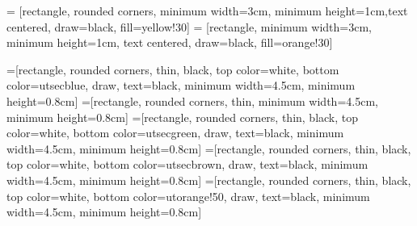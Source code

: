 \def\drawNodes(#1,#2,#3,#4,#5,#6,#7){ %
\foreach \x in {#1,#7,...,#2}{
	\foreach \y in {#3,#7,...,#4}{
		\foreach \z in {#5,#7,...,#6}{
				\draw[fill=red!60] (\x,\y,\z) circle (0.15);
				}
			}
	}				
		
}


\makeatletter
\newcommand\resetstackedplots{
\makeatletter
\pgfplots@stacked@isfirstplottrue
\makeatother
\addplot [forget plot,draw=none] coordinates{(16,0) (32,0) (64,0) (128,0) (256,0) (512,0) (1024,0) (2048,0) (4096,0) (8192,0) (16384,0) (32768,0) (65536,0) (131072,0) (262144,0)};
}
\makeatother

\makeatletter
\newcommand\resetstackedplotsOne{
\makeatletter
\pgfplots@stacked@isfirstplottrue
\makeatother
\addplot [forget plot,draw=none] coordinates{(16,0) (32,0) (64,0) (128,0) (256,0) (512,0) (1024,0) (2048,0) (4096,0)};
}
\makeatother

\makeatletter
\newcommand\resetstackedplotsTwo{
\makeatletter
\pgfplots@stacked@isfirstplottrue
\makeatother
\addplot [forget plot,draw=none] coordinates{(32,0) (64,0) (128,0) (256,0) (512,0) (1024,0) (2048,0) (4096,0) (8192,0) (16384,0) (32768,0) (65536,0) };
}
\makeatother


\makeatletter
\newcommand\resetstackedplotsThree{
\makeatletter
\pgfplots@stacked@isfirstplottrue
\makeatother
\addplot [forget plot,draw=none] coordinates{(2,0) (4,0) (8,0) (16,0) (32,0) (64,0)};
}
\makeatother


\makeatletter
\newcommand\resetstackedplotsFour{
\makeatletter
\pgfplots@stacked@isfirstplottrue
\makeatother
\addplot [forget plot,draw=none] coordinates{(4,0) (8,0) (16,0) (32,0) (64,0)};
}
\makeatother



 = [rectangle, rounded corners, minimum width=3cm, minimum height=1cm,text centered, draw=black, fill=yellow!30]
 = [rectangle, minimum width=3cm, minimum height=1cm, text centered, draw=black, fill=orange!30]

=[rectangle, rounded corners, thin,
black, top color=white, bottom color=utsecblue, draw, text=black,                           
minimum width=4.5cm, minimum height=0.8cm]
=[rectangle, rounded corners, thin,                           
minimum width=4.5cm, minimum height=0.8cm]
=[rectangle, rounded corners, thin,
black, top color=white, bottom color=utsecgreen, draw, text=black,                           
minimum width=4.5cm, minimum height=0.8cm]
=[rectangle, rounded corners, thin,
black, top color=white, bottom color=utsecbrown, draw, text=black,                           
minimum width=4.5cm, minimum height=0.8cm]
=[rectangle, rounded corners, thin,
black, top color=white, bottom color=utorange!50, draw, text=black,                           
minimum width=4.5cm, minimum height=0.8cm]